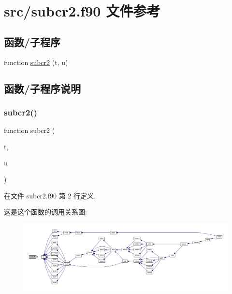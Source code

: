 \hypertarget{subcr2_8f90}{}\section{src/subcr2.f90 文件参考}
\label{subcr2_8f90}
\subsection*{函数/子程序}
\begin{DoxyCompactItemize}
\item 
function \mbox{\hyperlink{subcr2_8f90_aa1de559e81cd11f08631836ea3c42696}{subcr2}} (t, u)
\end{DoxyCompactItemize}


\subsection{函数/子程序说明}
\mbox{\label{subcr2_8f90_aa1de559e81cd11f08631836ea3c42696}} 
\subsubsection{\texorpdfstring{subcr2()}{subcr2()}}
{\footnotesize\ttfamily function subcr2 (\begin{DoxyParamCaption}\item[{}]{t,  }\item[{}]{u }\end{DoxyParamCaption})}



在文件 subcr2.\+f90 第 2 行定义.

这是这个函数的调用关系图\+:
\nopagebreak
\begin{figure}[H]
\begin{center}
\leavevmode
\includegraphics[width=350pt]{subcr2_8f90_aa1de559e81cd11f08631836ea3c42696_icgraph}
\end{center}
\end{figure}
